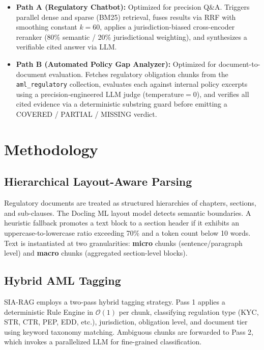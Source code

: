 \documentclass[conference, a4paper]{IEEEtran}
\begin{document}
\begin{itemize}
    \item \textbf{Path A (Regulatory Chatbot):} Optimized for precision Q\&A. Triggers parallel
    dense and sparse (BM25) retrieval, fuses results via RRF with smoothing constant $k{=}60$,
    applies a jurisdiction-biased cross-encoder reranker (80\% semantic / 20\% jurisdictional
    weighting), and synthesizes a verifiable cited answer via LLM.

    \item \textbf{Path B (Automated Policy Gap Analyzer):} Optimized for document-to-document
    evaluation. Fetches regulatory obligation chunks from the \texttt{aml\_regulatory} collection,
    evaluates each against internal policy excerpts using a precision-engineered LLM judge
    (temperature$=0$), and verifies all cited evidence via a deterministic substring guard before
    emitting a COVERED / PARTIAL / MISSING verdict.
\end{itemize}

\section{Methodology}

\subsection{Hierarchical Layout-Aware Parsing}

Regulatory documents are treated as structured hierarchies of chapters, sections, and sub-clauses.
The Docling ML layout model detects semantic boundaries. A heuristic fallback promotes a text
block to a section header if it exhibits an uppercase-to-lowercase ratio exceeding 70\% and a
token count below 10 words. Text is instantiated at two granularities: \textbf{micro} chunks
(sentence/paragraph level) and \textbf{macro} chunks (aggregated section-level blocks).

\subsection{Hybrid AML Tagging}

SIA-RAG employs a two-pass hybrid tagging strategy. Pass 1 applies a deterministic Rule Engine
in $\mathcal{O}(1)$ per chunk, classifying regulation type (KYC, STR, CTR, PEP, EDD, etc.),
jurisdiction, obligation level, and document tier using keyword taxonomy matching. Ambiguous chunks
are forwarded to Pass 2, which invokes a parallelized LLM for fine-grained classification.
\end{document}
